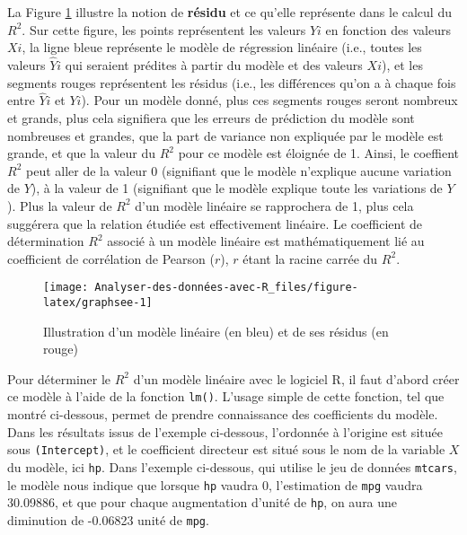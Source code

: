 \documentclass[
]{book}
\begin{document}
La Figure \ref{fig:graphsee} illustre la notion de \textbf{résidu} et ce qu'elle représente dans le calcul du \(R^2\). Sur cette figure, les points représentent les valeurs \(Y{i}\) en fonction des valeurs \(X{i}\), la ligne bleue représente le modèle de régression linéaire (i.e., toutes les valeurs \(\hat{Y}{i}\) qui seraient prédites à partir du modèle et des valeurs \(X{i}\)), et les segments rouges représentent les résidus (i.e., les différences qu'on a à chaque fois entre \(\hat{Y}{i}\) et \(Y{i}\)). Pour un modèle donné, plus ces segments rouges seront nombreux et grands, plus cela signifiera que les erreurs de prédiction du modèle sont nombreuses et grandes, que la part de variance non expliquée par le modèle est grande, et que la valeur du \(R^2\) pour ce modèle est éloignée de 1. Ainsi, le coeffient \(R^2\) peut aller de la valeur 0 (signifiant que le modèle n'explique aucune variation de \(Y\)), à la valeur de 1 (signifiant que le modèle explique toute les variations de \(Y\)). Plus la valeur de \(R^2\) d'un modèle linéaire se rapprochera de 1, plus cela suggérera que la relation étudiée est effectivement linéaire. Le coefficient de détermination \(R^2\) associé à un modèle linéaire est mathématiquement lié au coefficient de corrélation de Pearson (\(r\)), \(r\) étant la racine carrée du \(R^2\).

\begin{figure}

{\centering \texttt{[image: Analyser-des-données-avec-R\_files/figure-latex/graphsee-1]} 

}

\caption{Illustration d'un modèle linéaire (en bleu) et de ses résidus (en rouge)}\label{fig:graphsee}
\end{figure}

Pour déterminer le \(R^2\) d'un modèle linéaire avec le logiciel R, il faut d'abord créer ce modèle à l'aide de la fonction \texttt{lm()}. L'usage simple de cette fonction, tel que montré ci-dessous, permet de prendre connaissance des coefficients du modèle. Dans les résultats issus de l'exemple ci-dessous, l'ordonnée à l'origine est située sous \texttt{(Intercept)}, et le coefficient directeur est situé sous le nom de la variable \(X\) du modèle, ici \texttt{hp}. Dans l'exemple ci-dessous, qui utilise le jeu de données \texttt{mtcars}, le modèle nous indique que lorsque \texttt{hp} vaudra 0, l'estimation de \texttt{mpg} vaudra 30.09886, et que pour chaque augmentation d'unité de \texttt{hp}, on aura une diminution de -0.06823 unité de \texttt{mpg}.
\end{document}
